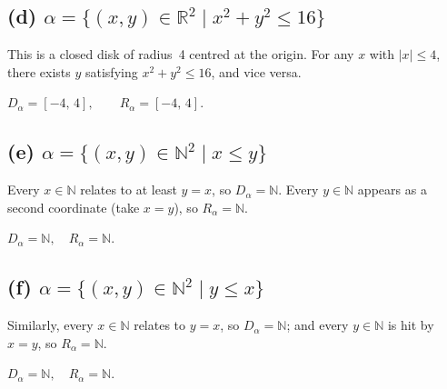 \documentclass[12pt, a4paper]{article}
\newcommand{\R}{\mathbb{R}}
\newcommand{\N}{\mathbb{N}}
\begin{document}
\subsection*{(d)\; $\alpha = \{(x,y) \in \R^2 \mid x^2 + y^2 \le 16\}$}

This is a closed disk of radius~4 centred at the origin.
For any $x$ with $|x| \le 4$, there exists $y$ satisfying $x^2 + y^2 \le 16$, and vice versa.

\begin{answerbox}
$D_\alpha = [-4,\, 4], \qquad R_\alpha = [-4,\, 4].$
\end{answerbox}

\begin{center}
\end{center}

\subsection*{(e)\; $\alpha = \{(x,y) \in \N^2 \mid x \le y\}$}

Every $x \in \N$ relates to at least $y=x$, so $D_\alpha = \N$.
Every $y \in \N$ appears as a second coordinate (take $x=y$), so $R_\alpha = \N$.

\begin{answerbox}
$D_\alpha = \N, \quad R_\alpha = \N.$
\end{answerbox}

\subsection*{(f)\; $\alpha = \{(x,y) \in \N^2 \mid y \le x\}$}

Similarly, every $x \in \N$ relates to $y=x$, so $D_\alpha = \N$;
and every $y \in \N$ is hit by $x=y$, so $R_\alpha = \N$.

\begin{answerbox}
$D_\alpha = \N, \quad R_\alpha = \N.$
\end{answerbox}
\end{document}
